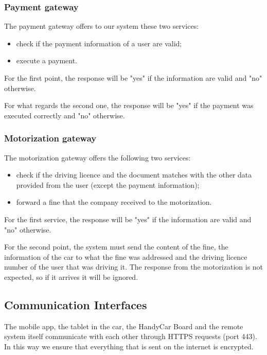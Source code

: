 \subsubsection{Payment gateway}
The payment gateway offers to our system these two services:
\begin{itemize}
\item check if the payment information of a user are valid;
\item execute a payment.
\end{itemize}

For the first point, the response will be "yes" if the information are valid and "no" otherwise.

For what regards the second one, the response will be "yes" if the payment was executed correctly and "no" otherwise.

\subsubsection{Motorization gateway}
The motorization gateway offers the following two services:
\begin{itemize}
\item check if the driving licence and the document matches with the other data provided from the user (except the payment information);
\item forward a fine that the company received to the motorization.
\end{itemize}

For the first service, the response will be "yes" if the information are valid and "no" otherwise.

For the second point, the system must send the content of the fine, the information of the car to what the fine was addressed and the driving licence number of the user that was driving it. The response from the motorization is not expected, so if it arrives it will be ignored.

\subsection{Communication Interfaces}
The mobile app, the tablet in the car, the HandyCar Board and the remote system itself communicate with each other through HTTPS requests (port 443). In this way we ensure that everything that is sent on the internet is encrypted.
